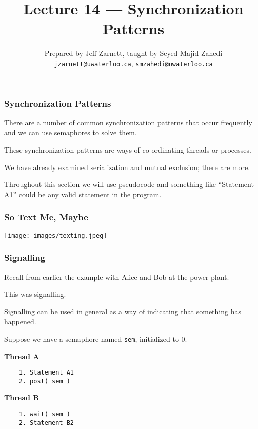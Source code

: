 

\title{Lecture 14 --- Synchronization Patterns }

\author{Prepared by Jeff Zarnett, taught by Seyed Majid Zahedi \\ \small \texttt{jzarnett@uwaterloo.ca}, \texttt{smzahedi@uwaterloo.ca}}
\date{}




\begin{frame}
	\titlepage

\end{frame}

\begin{frame}
	\frametitle{Synchronization Patterns}


	There are a number of common synchronization patterns that occur frequently and we can use semaphores to solve them.

	These synchronization patterns are ways of co-ordinating threads or processes.

	We have already examined serialization and mutual exclusion; there are more.

	Throughout this section we will use pseudocode and something like ``Statement A1'' could be any valid statement in the program.

\end{frame}


\begin{frame}
	\frametitle{So Text Me, Maybe}

	\begin{center}
		\texttt{[image: images/texting.jpeg]}
	\end{center}


\end{frame}


\begin{frame}[fragile]
	\frametitle{Signalling}

	Recall from earlier the example with Alice and Bob at the power plant.

	This was signalling.

	Signalling can be used in general as a way of indicating that something has happened.

	Suppose we have a semaphore named \texttt{sem}, initialized to 0.

	\begin{multicols}{2}
		\textbf{Thread A}
		\begin{verbatim}
	1. Statement A1
	2. post( sem )
  		\end{verbatim}
		\columnbreak
		\textbf{Thread B}\vspace{-2em}
		\begin{verbatim}
	1. wait( sem )
	2. Statement B2
  		\end{verbatim}
	\end{multicols}
	\vspace{-2em}


\end{frame}

